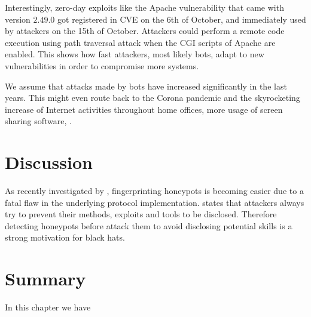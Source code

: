 Interestingly, zero-day exploits like the Apache vulnerability \cite{CVE-2021-42013} that came with version $2.49.0$ got registered in CVE on the 6th of October, and immediately used by attackers on the 15th of October.
Attackers could perform a remote code execution using path traversal attack when the CGI scripts of Apache are enabled.
This shows how fast attackers, most likely bots, adapt to new vulnerabilities in order to compromise more systems.


We assume that attacks made by bots have increased significantly in the last years.
This might even route back to the Corona pandemic and the skyrocketing increase of Internet activities throughout home offices, more usage of screen sharing software, .

\section{Discussion}

As recently investigated by \citet{vetterl2020}, fingerprinting honeypots is becoming easier due to a fatal flaw in the underlying protocol implementation.
\citet{vetterl2020} states that attackers always try to prevent their methods, exploits and tools to be disclosed.
Therefore detecting honeypots before attack them to avoid disclosing potential skills is a strong motivation for black hats.


\section{Summary}

In this chapter we have
